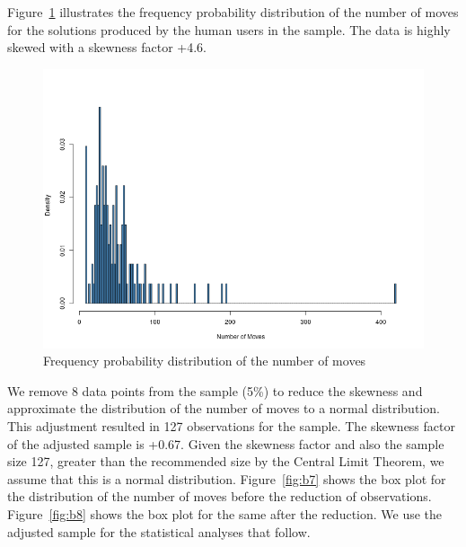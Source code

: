 Figure~\ref{fig:histvid} illustrates the frequency probability distribution of the number of moves for the solutions produced by the human users in the sample. 
The data is highly skewed with a skewness factor +4.6.
\begin{figure}[tpb]
  \centering
\includegraphics[width=0.7\columnwidth]{img/histo_video.png}
  \caption{Frequency probability distribution of the number of moves}
  \label{fig:histvid}
\end{figure}
We remove 8 data points from the sample (5\%) to reduce the skewness and approximate the distribution of the number of moves to a normal distribution.
This adjustment resulted in 127 observations for the sample.
The skewness factor of the adjusted sample is +0.67.
Given the skewness factor and also the sample size 127, greater than the recommended size by the Central Limit Theorem, we assume that this is a normal distribution.
Figure~\ref{fig:b7} shows the box plot for the distribution of the number of moves before the reduction of observations.
Figure~\ref{fig:b8} shows the box plot for the same after the reduction.
We use the adjusted sample for the statistical analyses that follow.

